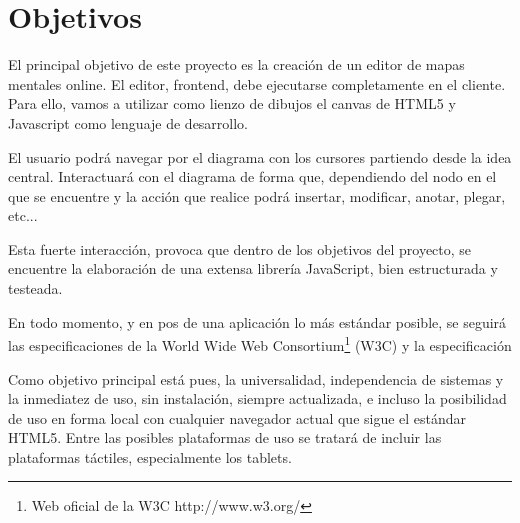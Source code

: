 \section{Objetivos}

El principal objetivo de este proyecto es la creación de un editor de mapas mentales online. El editor, frontend, debe ejecutarse completamente en el cliente. Para ello, vamos a utilizar como lienzo de dibujos el canvas de HTML5 y Javascript como lenguaje de desarrollo. 

El usuario podrá navegar por el diagrama con los cursores partiendo desde la idea central. Interactuará con el diagrama de forma que, dependiendo del nodo en el que se encuentre y la acción que realice podrá insertar, modificar, anotar, plegar, etc...

Esta fuerte interacción, provoca que dentro de los objetivos del proyecto, se encuentre la elaboración de una  extensa librería JavaScript, bien estructurada y testeada. 

En todo momento, y en pos de una aplicación lo más estándar posible, se seguirá las especificaciones de la World Wide Web Consortium\footnote{Web oficial de la W3C http://www.w3.org/} (W3C) y la especificación 

Como objetivo principal está pues, la universalidad, independencia de sistemas y la inmediatez de uso, sin instalación, siempre actualizada, e incluso la posibilidad de uso en forma local con cualquier navegador actual que sigue el estándar HTML5.  Entre las posibles plataformas de uso se tratará de incluir las plataformas táctiles, especialmente los tablets.
